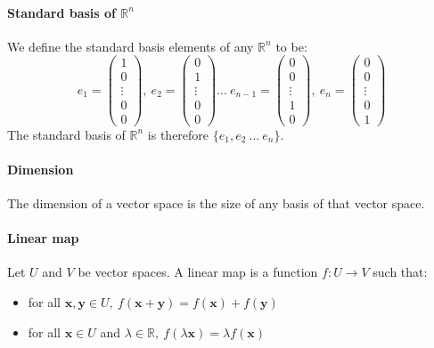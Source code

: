 \documentclass{scrartcl}
\newcommand{\R}{\mathbb{R}}
\renewcommand{\vec}[1]{\mathbf{#1}}
\begin{document}
\paragraph{Standard basis of $ \R^{n} $}
We define the standard basis elements of any $ \R^{n} $ to be:
\begin{equation}
e_{1} = 
\begin{pmatrix}
1 \\ 0 \\ \vdots \\ 0 \\ 0
\end{pmatrix} , \ 
e_{2} = 
\begin{pmatrix}
0 \\ 1 \\ \vdots \\ 0 \\ 0
\end{pmatrix} ... \
e_{n-1} = 
\begin{pmatrix}
0 \\ 0 \\ \vdots \\ 1 \\ 0
\end{pmatrix} , \
e_{n} = 
\begin{pmatrix}
0 \\ 0 \\ \vdots \\ 0 \\ 1
\end{pmatrix}
\end{equation}
The standard basis of $ \R^{n} $ is therefore $ \{e_{1}, e_{2} \ ... \ e_{n} \} $.

\paragraph{Dimension}
The dimension of a vector space is the size of any basis of that vector space.

\paragraph{Linear map}
Let $ U $ and $ V $ be vector spaces. A linear map is a function $ f : U \to V $ such that:
\begin{itemize}
\item for all $ \vec{x}, \vec{y} \in U, \ f(\vec{x} + \vec{y}) = f(\vec{x}) + f(\vec{y}) $
\item for all $ \vec{x} \in U $ and $ \lambda \in \R, \ f(\lambda \vec{x}) = \lambda f(\vec{x}) $
\end{itemize}
\end{document}
